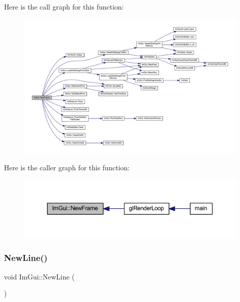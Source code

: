 Here is the call graph for this function\+:
\nopagebreak
\begin{figure}[H]
\begin{center}
\leavevmode
\includegraphics[width=350pt]{namespace_im_gui_ab3f1fc018f903b7ad79fd10663375774_cgraph}
\end{center}
\end{figure}
Here is the caller graph for this function\+:
\nopagebreak
\begin{figure}[H]
\begin{center}
\leavevmode
\includegraphics[width=350pt]{namespace_im_gui_ab3f1fc018f903b7ad79fd10663375774_icgraph}
\end{center}
\end{figure}
\mbox{\label{namespace_im_gui_a77f8b0a33e5335f98661f99e720411da}} 
\subsubsection{\texorpdfstring{New\+Line()}{NewLine()}}
{\footnotesize\ttfamily void Im\+Gui\+::\+New\+Line (\begin{DoxyParamCaption}{ }\end{DoxyParamCaption})}

